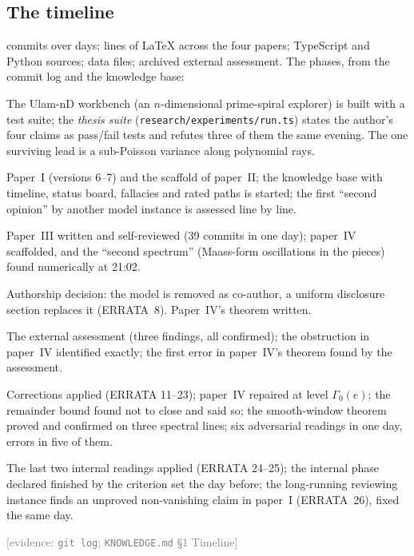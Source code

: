 \documentclass[11pt,a4paper]{article}
\newcommand{\evidence}[1]{{\footnotesize\textcolor{Gray}{[evidence: #1]}}}
\newcommand{\file}[1]{\texttt{#1}}
\begin{document}
\subsection{The timeline}
\begin{center}\small\CommitsTable\end{center}
\noindent\NCommits{} commits over \NDays{} days; \NTexLines{} lines of \LaTeX{} across the four papers;
\NScriptsTS{} TypeScript and \NScriptsPy{} Python sources; \NData{} data files; \NReviews{} archived external
assessment. The phases, from the commit log and the knowledge base:
\begin{description}[leftmargin=2.2em,itemsep=1pt]
\item[8 Sep] The Ulam-nD workbench (an $n$-dimensional prime-spiral explorer) is built with a test suite; the
  \emph{thesis suite} (\file{research/experiments/run.ts}) states the author's four claims as pass/fail tests and
  refutes three of them the same evening. The one surviving lead is a sub-Poisson variance along polynomial rays.
\item[9 Sep] Paper~I (versions 6--7) and the scaffold of paper~II; the knowledge base with timeline, status board,
  fallacies and rated paths is started; the first ``second opinion'' by another model instance is assessed
  line by line.
\item[10 Sep] Paper~III written and self-reviewed (39 commits in one day); paper~IV scaffolded, and the ``second
  spectrum'' (Maass-form oscillations in the pieces) found numerically at 21:02.
\item[11 Sep] Authorship decision: the model is removed as co-author, a uniform disclosure section replaces it
  (ERRATA~8). Paper~IV's theorem written.
\item[12 Sep] The external assessment (three findings, all confirmed); the obstruction in paper~IV identified
  exactly; the first error in paper~IV's theorem found by the assessment.
\item[13 Sep] Corrections applied (ERRATA 11--23); paper~IV repaired at level $\Gamma_0(e)$; the remainder bound
  found not to close and said so; the smooth-window theorem proved and confirmed on three spectral lines; six
  adversarial readings in one day, errors in five of them.
\item[14 Sep] The last two internal readings applied (ERRATA 24--25); the internal phase declared finished by the
  criterion set the day before; the long-running reviewing instance finds an unproved non-vanishing claim in paper~I
  (ERRATA~26), fixed the same day.
\end{description}
\evidence{\texttt{git log}; \file{KNOWLEDGE.md} \S1 Timeline}
\end{document}
